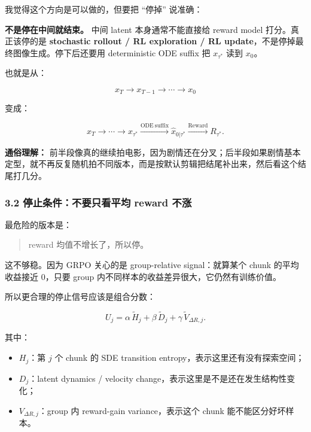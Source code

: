 我觉得这个方向是可以做的，但要把 ``停掉'' 说准确：

\begin{warnbox}
\textbf{不是停在中间就结束。} 中间 latent 本身通常不能直接给 reward model 打分。真正该停的是 \textbf{stochastic rollout / RL exploration / RL update}，不是停掉最终图像生成。停下后还要用 deterministic ODE suffix 把 \(x_{\tau^*}\) 读到 \(x_0\)。
\end{warnbox}

也就是从：

\[
x_T\rightarrow x_{T-1}\rightarrow\cdots\rightarrow x_0
\]

变成：

\[
x_T\rightarrow\cdots\rightarrow x_{\tau^*}
\xrightarrow{\mathrm{ODE\ suffix}}
\hat{x}_{0|\tau^*}
\xrightarrow{\mathrm{Reward}}
R_{\tau^*}.
\]

\begin{intubox}
\textbf{通俗理解：} 前半段像真的继续拍电影，因为剧情还在分叉；后半段如果剧情基本定型，就不再反复随机拍不同版本，而是按默认剪辑把结尾补出来，然后看这个结尾打几分。
\end{intubox}

\subsubsection{3.2 停止条件：不要只看平均 reward 不涨}

最危险的版本是：

\begin{quote}
reward 均值不增长了，所以停。
\end{quote}

这不够稳。因为 GRPO 关心的是 group-relative signal：就算某个 chunk 的平均收益接近 0，只要 group 内不同样本的收益差异很大，它仍然有训练价值。

所以更合理的停止信号应该是组合分数：

\[
U_j
=
\alpha\,\widetilde{H}_j
+
\beta\,\widetilde{D}_j
+
\gamma\,\widetilde{V}_{\Delta R,j}.
\]

其中：

\begin{itemize}[leftmargin=1.5em]
  \item \(H_j\)：第 \(j\) 个 chunk 的 SDE transition entropy，表示这里还有没有探索空间；
  \item \(D_j\)：latent dynamics / velocity change，表示这里是不是还在发生结构性变化；
  \item \(V_{\Delta R,j}\)：group 内 reward-gain variance，表示这个 chunk 能不能区分好坏样本。
\end{itemize}

